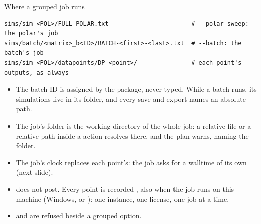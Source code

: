 \begin{frame}[fragile]{Where a grouped job runs}
\begin{lstlisting}[style=ftsbase]
sims/sim_<POL>/FULL-POLAR.txt                       # --polar-sweep: the polar's job
sims/batch/<matrix>_b<ID>/BATCH-<first>-<last>.txt  # --batch: the batch's job
sims/sim_<POL>/datapoints/DP-<point>/               # each point's outputs, as always
\end{lstlisting}
\begin{itemize}\small
  \item The batch ID is assigned by the package, never typed. While a batch
        runs, its simulations live in its folder, and every save and export
        names an absolute path.
  \item The job's folder is the working directory of the whole job: a
        relative  file or a relative path inside a
         action resolves there, and the plan warns,
        naming the folder.
  \item The job's clock replaces each point's: the job asks for a walltime of
        its own (next slide).
  \item {} does not post. Every point is recorded ,
        also when the job runs on this machine (Windows, or
        ): one instance, one license, one job at a time.
  \item {} and 
        are refused beside a grouped option.
\end{itemize}
\end{frame}

